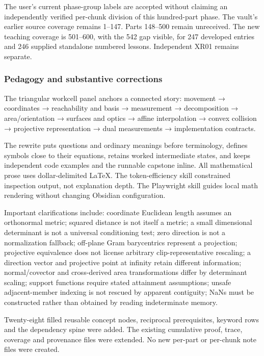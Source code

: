 The user's current phase-group labels are accepted without claiming an independently verified per-chunk division of this hundred-part phase. The vault's earlier source coverage remains 1--147. Parts 148--500 remain unreceived. The new teaching coverage is 501--600, with the 542 gap visible, for 247 developed entries and 246 supplied standalone numbered lessons. Independent XR01 remains separate.

\subsubsection{Pedagogy and substantive corrections}\label{appendix-a103e7846d21-pedagogy-and-substantive-corrections}

The triangular workcell panel anchors a connected story: movement → coordinates → reachability and basis → measurement → decomposition → area/orientation → surfaces and optics → affine interpolation → convex collision → projective representation → dual measurements → implementation contracts.

The rewrite puts questions and ordinary meanings before terminology, defines symbols close to their equations, retains worked intermediate states, and keeps independent code examples and the runnable capstone inline. All mathematical prose uses dollar-delimited LaTeX. The token-efficiency skill constrained inspection output, not explanation depth. The Playwright skill guides local math rendering without changing Obsidian configuration.

Important clarifications include: coordinate Euclidean length assumes an orthonormal metric; squared distance is not itself a metric; a small dimensional determinant is not a universal conditioning test; zero direction is not a normalization fallback; off-plane Gram barycentrics represent a projection; projective equivalence does not license arbitrary clip-representative rescaling; a direction vector and projective point at infinity retain different information; normal/covector and cross-derived area transformations differ by determinant scaling; support functions require stated attainment assumptions; unsafe adjacent-member indexing is not rescued by apparent contiguity; NaNs must be constructed rather than obtained by reading indeterminate memory.

Twenty-eight filled reusable concept nodes, reciprocal prerequisites, keyword rows and the dependency spine were added. The existing cumulative proof, trace, coverage and provenance files were extended. No new per-part or per-chunk note files were created.

